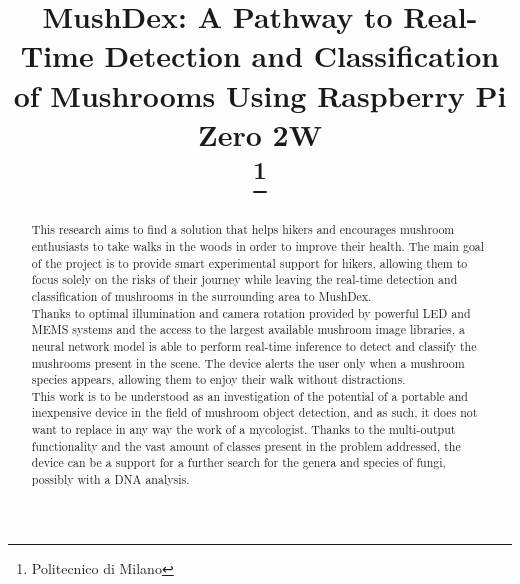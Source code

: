 \documentclass[conference]{IEEEtran}
\begin{document}
\title{MushDex: A Pathway to Real-Time Detection and Classification of Mushrooms Using Raspberry Pi Zero 2W\\
\thanks{Politecnico di Milano}
}

\author{
	\and
	\and
	
}

\maketitle

\begin{abstract}
This research aims to find a solution that helps hikers and encourages mushroom enthusiasts to take walks in the woods in order to improve their health. The main goal of the project is to provide smart experimental support for hikers, allowing them to focus solely on the risks of their journey while leaving the real-time detection and classification of mushrooms in the surrounding area to MushDex.\\
Thanks to optimal illumination and camera rotation provided by powerful LED and MEMS systems and the access to the largest available mushroom image libraries, a neural network model is able to perform real-time inference to detect and classify the mushrooms present in the scene. The device alerts the user only when a mushroom species appears, allowing them to enjoy their walk without distractions.\\
This work is to be understood as an investigation of the potential of a portable and inexpensive device in the field of mushroom object detection, and as such, it does not want to replace in any way the work of a mycologist. Thanks to the multi-output functionality and the vast amount of classes present in the problem addressed, the device can be a support for a further search for the genera and species of fungi, possibly with a DNA analysis.
\end{abstract}
\end{document}
